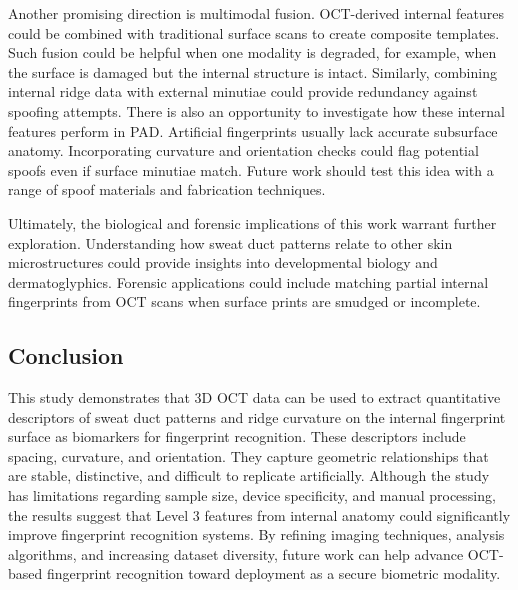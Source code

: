 Another promising direction is multimodal fusion. OCT-derived internal features could be combined with traditional surface scans to create composite templates. Such fusion could be helpful when one modality is degraded, for example, when the surface is damaged but the internal structure is intact. Similarly, combining internal ridge data with external minutiae could provide redundancy against spoofing attempts. There is also an opportunity to investigate how these internal features perform in PAD. Artificial fingerprints usually lack accurate subsurface anatomy. Incorporating curvature and orientation checks could flag potential spoofs even if surface minutiae match. Future work should test this idea with a range of spoof materials and fabrication techniques. 

Ultimately, the biological and forensic implications of this work warrant further exploration. Understanding how sweat duct patterns relate to other skin microstructures could provide insights into developmental biology and dermatoglyphics. Forensic applications could include matching partial internal fingerprints from OCT scans when surface prints are smudged or incomplete.
\subsection{Conclusion}

This study demonstrates that 3D OCT data can be used to extract quantitative descriptors of sweat duct patterns and ridge curvature on the internal fingerprint surface as biomarkers for fingerprint recognition. These descriptors include spacing, curvature, and orientation. They capture geometric relationships that are stable, distinctive, and difficult to replicate artificially. Although the study has limitations regarding sample size, device specificity, and manual processing, the results suggest that Level 3 features from internal anatomy could significantly improve fingerprint recognition systems. By refining imaging techniques, analysis algorithms, and increasing dataset diversity, future work can help advance OCT-based fingerprint recognition toward deployment as a secure biometric modality.